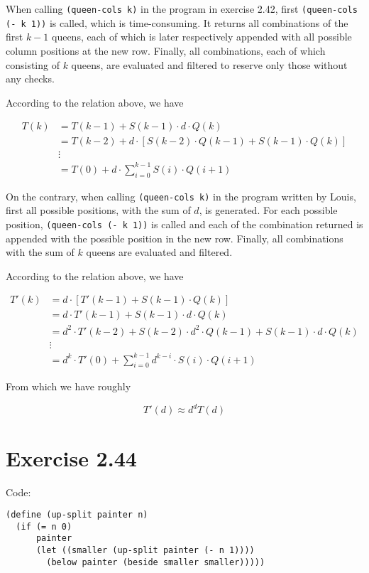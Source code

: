 \documentclass[../main.tex]{subfiles}
\begin{document}
When calling \lstinline{(queen-cols k)} in the
 program in exercise 2.42, first \lstinline{(queen-cols (- k 1))}
 is called, which is time-consuming.
 It returns all combinations of the first $k-1$
 queens, each of which is later respectively appended
 with all possible column positions at the new row.
 Finally, all combinations, each of which consisting
 of $k$ queens, are evaluated and filtered to reserve
 only those without any checks.

According to the relation above, we have

\begin{align*}
T(k) &= T(k-1) + S(k-1) \cdot d \cdot Q(k) \\
&= T(k-2) + d \cdot \left[S(k-2) \cdot Q(k-1) + S(k-1) \cdot Q(k)\right] \\
&\vdots \\
&= T(0) + d \cdot \sum_{i=0}^{k-1} S(i) \cdot Q(i+1)
\end{align*}

On the contrary, when calling \lstinline{(queen-cols k)}
 in the program written by Louis, first all possible
 positions, with the sum of $d$, is generated. For each
 possible position, \lstinline{(queen-cols (- k 1))} is
 called and each of the combination returned is appended
 with the possible position in the new row. Finally,
 all combinations with the sum of $k$ queens are evaluated
 and filtered.

According to the relation above, we have

\begin{align*}
T'(k) &= d \cdot \left[T'(k-1) + S(k-1) \cdot Q(k)\right] \\
&= d \cdot T'(k-1) + S(k-1) \cdot d \cdot Q(k) \\
&= d^2 \cdot T'(k-2) + S(k-2) \cdot d^2 \cdot Q(k-1) + S(k-1) \cdot d \cdot Q(k) \\
&\vdots \\
&= d^k \cdot T'(0) + \sum_{i=0}^{k-1} d^{k-i} \cdot S(i) \cdot Q(i + 1)
\end{align*}

From which we have roughly

$$
T'(d) \approx d^d T(d)
$$

\section{Exercise 2.44}

Code:

\begin{lstlisting}
(define (up-split painter n)
  (if (= n 0)
      painter
      (let ((smaller (up-split painter (- n 1))))
        (below painter (beside smaller smaller)))))
\end{lstlisting}
\end{document}
